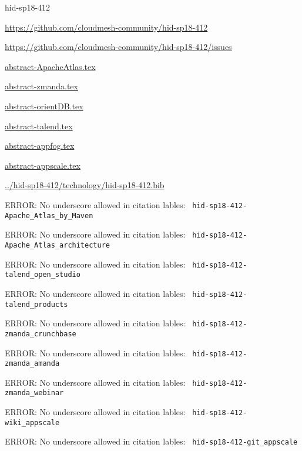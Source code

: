 \begin{IU}

hid-sp18-412

\url{https://github.com/cloudmesh-community/hid-sp18-412}

\url{https://github.com/cloudmesh-community/hid-sp18-412/issues}

\href{https://github.com/cloudmesh-community/hid-sp18-412/blob/master//technology/abstract-ApacheAtlas.tex}{abstract-ApacheAtlas.tex}

\href{https://github.com/cloudmesh-community/hid-sp18-412/blob/master//technology/abstract-zmanda.tex}{abstract-zmanda.tex}

\href{https://github.com/cloudmesh-community/hid-sp18-412/blob/master//technology/abstract-orientDB.tex}{abstract-orientDB.tex}

\href{https://github.com/cloudmesh-community/hid-sp18-412/blob/master//technology/abstract-talend.tex}{abstract-talend.tex}

\href{https://github.com/cloudmesh-community/hid-sp18-412/blob/master//technology/abstract-appfog.tex}{abstract-appfog.tex}

\href{https://github.com/cloudmesh-community/hid-sp18-412/blob/master//technology/abstract-appscale.tex}{abstract-appscale.tex}

\href{https://github.com/cloudmesh-community/hid-sp18-412/blob/master//technology/hid-sp18-412.bib}{../hid-sp18-412/technology/hid-sp18-412.bib}

 ERROR: No underscore allowed in citation lables: \verb| hid-sp18-412-Apache_Atlas_by_Maven |

 ERROR: No underscore allowed in citation lables: \verb| hid-sp18-412-Apache_Atlas_architecture |

 ERROR: No underscore allowed in citation lables: \verb| hid-sp18-412-talend_open_studio |

 ERROR: No underscore allowed in citation lables: \verb| hid-sp18-412-talend_products |

 ERROR: No underscore allowed in citation lables: \verb| hid-sp18-412-zmanda_crunchbase |

 ERROR: No underscore allowed in citation lables: \verb| hid-sp18-412-zmanda_amanda |

 ERROR: No underscore allowed in citation lables: \verb| hid-sp18-412-zmanda_webinar |

 ERROR: No underscore allowed in citation lables: \verb| hid-sp18-412-wiki_appscale |

 ERROR: No underscore allowed in citation lables: \verb| hid-sp18-412-git_appscale |


\end{IU}
